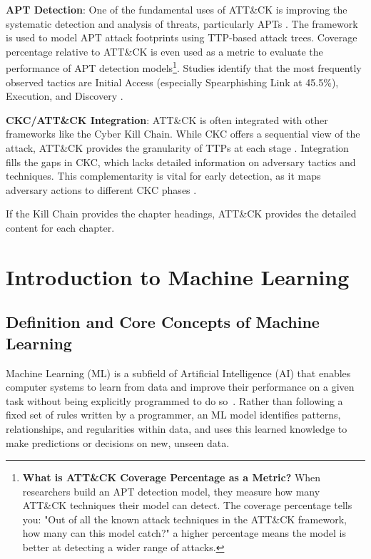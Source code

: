 \textbf{APT Detection}: One of the fundamental uses of ATT\&CK is improving the systematic detection and analysis of threats, particularly APTs \cite{jiang2025mitre}. The framework is used to model APT attack footprints using TTP-based attack trees. Coverage percentage relative to ATT\&CK is even used as a metric to evaluate the performance of APT detection models\footnote{\textbf{What is ATT\&CK Coverage Percentage as a Metric?} When researchers build an APT detection model, they measure how many ATT\&CK techniques their model can detect. The coverage percentage tells you: "Out of all the known attack techniques in the ATT\&CK framework, how many can this model catch?"  a higher percentage means the model is better at detecting a wider range of attacks.}. Studies identify that the most frequently observed tactics are Initial Access (especially Spearphishing Link at 45.5\%), Execution, and Discovery \cite{jiang2025mitre, cisa202x}.

\textbf{CKC/ATT\&CK Integration}: ATT\&CK is often integrated with other frameworks like the Cyber Kill Chain. While CKC offers a sequential view of the attack, ATT\&CK provides the granularity of TTPs at each stage \cite{jiang2025mitre}. Integration fills the gaps in CKC, which lacks detailed information on adversary tactics and techniques. This complementarity is vital for early detection, as it maps adversary actions to different CKC phases \cite{jiang2025mitre}.

If the Kill Chain provides the chapter headings, ATT\&CK provides the detailed content for each chapter.

\section{Introduction to Machine Learning}

\subsection{Definition and Core Concepts of Machine Learning}

Machine Learning (ML) is a subfield of Artificial Intelligence (AI) that enables computer systems to learn from data and improve their performance on a given task without being explicitly programmed to do so~\cite{bishop2006pattern}. Rather than following a fixed set of rules written by a programmer, an ML model identifies patterns, relationships, and regularities within data, and uses this learned knowledge to make predictions or decisions on new, unseen data.

